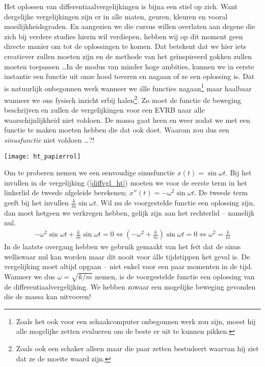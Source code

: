 \documentclass{ximera}
\begin{document}
	Het oplossen van differentiaalvergelijkingen is bijna een stiel op zich. Want dergelijke vergelijkingen zijn er in alle maten, geuren, kleuren en vooral moeilijkheidsgraden. En aangezien we die cursus willen overlaten aan degene die zich bij verdere studies hierin wil verdiepen, hebben wij op dit moment geen directe manier om tot de oplossingen te komen. Dat betekent dat we hier iets creatiever zullen moeten zijn en de methode van het ge\"inspireerd gokken zullen moeten toepassen \ldots In de modus van minder hoge ambities, kunnen we in eerste instantie een functie uit onze hoed toveren en nagaan of ze een oplossing is. Dat is natuurlijk onbegonnen werk wanneer we \'alle functies nagaan\footnote{Zoals het ook voor een schaakcomputer onbegonnen werk zou zijn, moest hij alle mogelijke zetten evalueren om de beste er uit te kunnen pikken.} maar haalbaar wanneer we ons fysisch inzicht erbij halen\footnote{Zoals ook een schaker alleen maar die paar zetten bestudeert waarvan hij ziet dat ze de moeite waard zijn.}. Zo moet de functie de beweging beschrijven en zullen de vergelijkingen voor een EVRB naar alle waarschijnlijkheid niet voldoen. De massa gaat heen en weer zodat we met een functie te maken moeten hebben die dat ook doet. Waarom zou dus een \emph{sinusfunctie} niet voldoen \ldots?!
	\begin{image}
	
	\texttt{[image: ht\_papierrol]}
	\end{image}
	
	Om te proberen nemen we een eenvoudige sinusfunctie $x(t)=\sin\omega t$. Bij het invullen in de vergelijking (\ref{diffvgl_ht}) moeten we voor de eerste term in het linkerlid de tweede afgeleide berekenen; $x''(t)=-\omega^2\sin\omega t$. De tweede term geeft bij het invullen $\frac{k}{m}\sin\omega t$. Wil nu de voorgestelde functie een oplossing zijn, dan moet hetgeen we verkregen hebben, gelijk zijn aan het rechterlid -- namelijk nul.
	\begin{eqnarray*}
	 -\omega^2\sin\omega t+\frac{k}{m}\sin\omega t=0\Leftrightarrow\left(-\omega^2+\frac{k}{m}\right)\sin\omega t=0\Leftrightarrow\omega^2=\frac{k}{m}
	\end{eqnarray*}
	In de laatste overgang hebben we gebruik gemaakt van het feit dat de sinus welliswaar nul kan worden maar dit nooit voor \'alle tijdstippen het geval is. De vergelijking moet altijd opgaan -- niet enkel voor een paar momenten in de tijd. Wanneer we dus $\omega=\sqrt{k/m}$ nemen, is de voorgestelde functie een oplossing van de differentiaalvergelijking. We hebben zowaar een mogelijke beweging gevonden die de massa kan uitvoeren!
	
\end{document}
